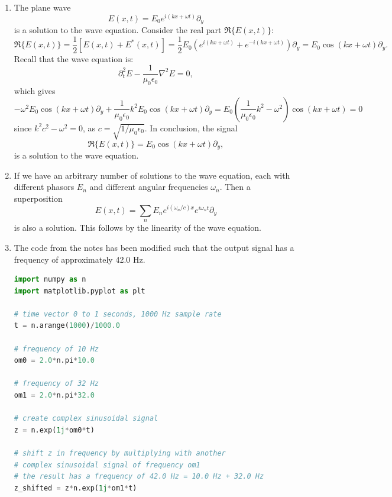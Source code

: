 \begin{enumerate}
\item The plane wave
$$E(x,t)=E_{0}e^{i(kx+\omega t)}\partial_{y}$$
is a solution to the wave equation. Consider the real part $\Re\{E(x,t)\}$:
$$\Re\{E(x,t)\}=\frac{1}{2}[E(x,t)+E^{*}(x,t)]=\frac{1}{2}E_{0}(e^{i(kx+\omega t)}+e^{-i(kx+\omega t)})\partial_{y}=E_{0}\cos(kx+\omega t)\partial_{y}.$$
Recall that the wave equation is:
$$\partial_{t}^{2}E-\frac{1}{\mu_{0}\epsilon_{0}}\nabla^{2}E=0,$$
which gives
$$-\omega^{2}E_{0}\cos(kx+\omega t)\partial_{y}+\frac{1}{\mu_{0}\epsilon_{0}}k^{2}E_{0}\cos(kx+\omega t)\partial_{y}=E_{0}\left(\frac{1}{\mu_{0}\epsilon_{0}}k^{2}-\omega^{2}\right)\cos(kx+\omega t)=0$$
since $k^{2}c^{2}-\omega^{2}=0$, as $c=\sqrt{1/\mu_0\epsilon_0}$. In conclusion, the signal
$$\Re\{E(x,t)\}=E_{0}\cos(kx+\omega t)\partial_{y},$$
is a solution to the wave equation. 

\item If we have an arbitrary number of solutions to the wave equation, each with different phasors $E_{n}$ and different angular frequencies $\omega_{n}$. Then a superposition 
$$E(x,t)=\sum_{n}E_{n}e^{i(\omega_{n}/c)x}e^{i\omega_{n}t}\partial_{y}$$
is also a solution. This follows by the linearity of the wave equation. 

\item The code from the notes has been modified such that the output signal has a frequency of approximately 42.0 Hz. 
\begin{lstlisting}[language=Python, caption=Adding frequencies,label=code:ex6.6]
import numpy as n
import matplotlib.pyplot as plt

# time vector 0 to 1 seconds, 1000 Hz sample rate
t = n.arange(1000)/1000.0

# frequency of 10 Hz
om0 = 2.0*n.pi*10.0

# frequency of 32 Hz
om1 = 2.0*n.pi*32.0

# create complex sinusoidal signal
z = n.exp(1j*om0*t)

# shift z in frequency by multiplying with another 
# complex sinusoidal signal of frequency om1
# the result has a frequency of 42.0 Hz = 10.0 Hz + 32.0 Hz
z_shifted = z*n.exp(1j*om1*t)


\end{lstlisting}
\end{enumerate}
